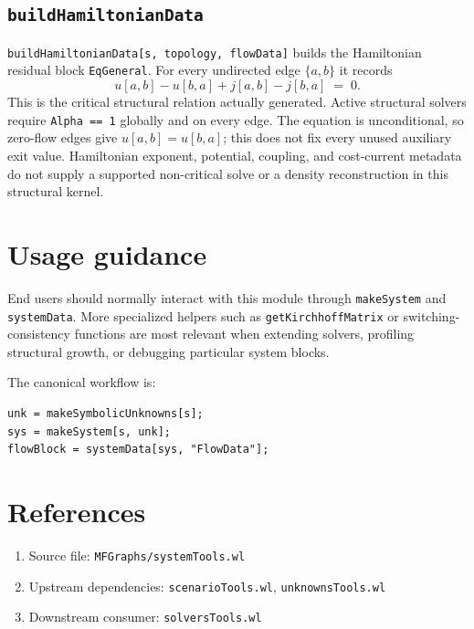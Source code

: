 \documentclass[11pt]{article}
\begin{document}
\subsection*{\texttt{buildHamiltonianData}}

\texttt{buildHamiltonianData[s, topology, flowData]} builds the Hamiltonian residual block \texttt{EqGeneral}. For every undirected edge $\{a, b\}$ it records
\[
u[a, b] - u[b, a] + j[a, b] - j[b, a] \;=\; 0.
\]
This is the critical structural relation actually generated. Active structural
solvers require \texttt{Alpha == 1} globally and on every edge. The equation is
unconditional, so zero-flow edges give $u[a,b]=u[b,a]$; this does not fix every
unused auxiliary exit value. Hamiltonian exponent, potential, coupling, and
cost-current metadata do not supply a supported non-critical solve or a density
reconstruction in this structural kernel.

\section{Usage guidance}

End users should normally interact with this module through \texttt{makeSystem} and \texttt{systemData}. More specialized helpers such as \texttt{getKirchhoffMatrix} or switching-consistency functions are most relevant when extending solvers, profiling structural growth, or debugging particular system blocks.

The canonical workflow is:

\begin{verbatim}
unk = makeSymbolicUnknowns[s];
sys = makeSystem[s, unk];
flowBlock = systemData[sys, "FlowData"];
\end{verbatim}

\section*{References}

\begin{enumerate}
\item Source file: \texttt{MFGraphs/systemTools.wl}
\item Upstream dependencies: \texttt{scenarioTools.wl}, \texttt{unknownsTools.wl}
\item Downstream consumer: \texttt{solversTools.wl}
\end{enumerate}
\end{document}
